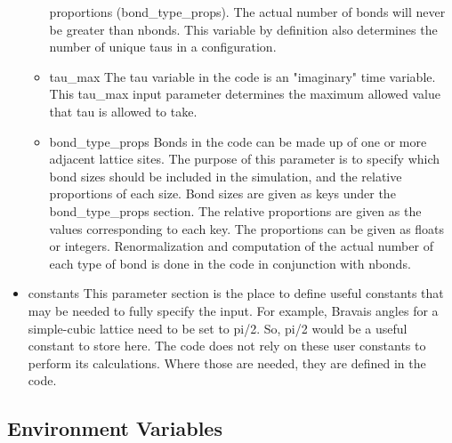 \begin{itemize}
\begin{itemize}
        proportions (bond_type_props).
        The actual number of bonds will never be greater than nbonds.
        This variable by definition also determines the number of unique taus
        in a configuration.
      \item{tau_max}
        The tau variable in the code is an "imaginary" time variable. 
        This tau_max input parameter determines the maximum allowed value that
        tau is allowed to take.
      \item{bond_type_props}
        Bonds in the code can be made up of one or more adjacent lattice sites.
        The purpose of this parameter is to specify which bond sizes should be
        included in the simulation, and the relative proportions of each size.
        Bond sizes are given as keys under the bond_type_props section.
        The relative proportions are given as the values corresponding to each 
        key.
        The proportions can be given as floats or integers. 
        Renormalization and computation of the actual number of each type of 
        bond is done in the code in conjunction with nbonds.  
    \end{itemize}
  \item{constants}
    This parameter section is the place to define useful constants that may be
    needed to fully specify the input. 
    For example, Bravais angles for a simple-cubic lattice need to be set to 
    pi/2.
    So, pi/2 would be a useful constant to store here.
    The code does not rely on these user constants to perform its calculations.
    Where those are needed, they are defined in the code. 
\end{itemize}


\subsection{Environment Variables}